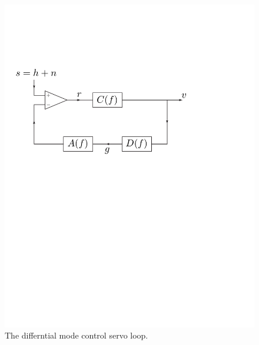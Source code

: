 \begin{figure}[p]
\begin{center}
\includegraphics[width=\linewidth]{figures/inspiral/darm}
\end{center}
\caption[Differential mode control servo loop]{\label{f:darmloop}%
The differntial mode control servo loop.}
\end{figure}

